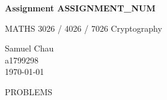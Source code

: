 \documentclass[12pt]{article}
\begin{document}
\begin{titlepage}
    \centering
    \vspace*{5cm}
    
    \Huge
    \textbf{Assignment {{ASSIGNMENT_NUM}}}
    
    \vspace{1cm}
    
    \Large
    MATHS 3026 / 4026 / 7026 Cryptography
    
    \vfill
    
    \large
    Samuel Chau\\
    a1799298\\
    \vspace{0.5cm}
    \today
\end{titlepage}


{{PROBLEMS}}
\end{document}
